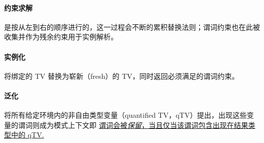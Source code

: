 \paragraph{约束求解} 是按从左到右的顺序进行的，这一过程会不断的累积替换法则；谓词约束也在此被收集并作为残余约束用于实例解析。
\paragraph{实例化} 将绑定的 TV 替换为崭新（fresh）的 TV，同时返回必须满足的谓词约束。
\vspace{-2em}
\paragraph{泛化} 将所有给定环境内的非自由类型变量（quantified TV，qTV）提出，出现这些变量的谓词则成为模式上下文即
\underline{谓词会被\emph{保留}，当且仅当该谓词包含出现在结果类型中的 qTV. }
\vspace{-2.5em}
